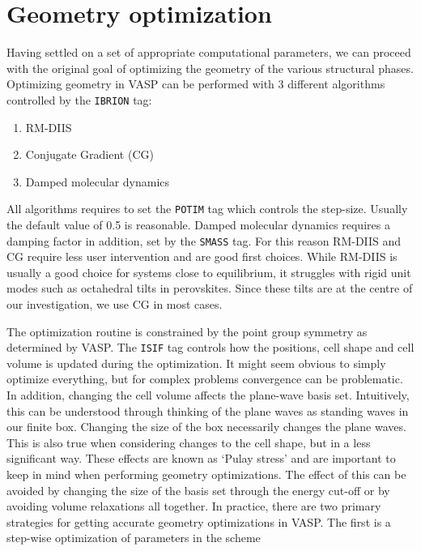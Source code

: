 \section{Geometry optimization}
Having settled on a set of appropriate computational parameters, we can proceed with the original goal of optimizing the geometry of the various structural phases. Optimizing geometry in VASP can be performed with 3 different algorithms controlled by the \texttt{IBRION} tag:

\begin{enumerate}
	\item RM-DIIS
	\item Conjugate Gradient (CG)
	\item Damped molecular dynamics
\end{enumerate}

\noindent All algorithms requires to set the \texttt{POTIM} tag which controls the step-size. Usually the default value of 0.5 is reasonable. Damped molecular dynamics requires a damping factor in addition, set by the \texttt{SMASS} tag. For this reason RM-DIIS and CG require less user intervention and are good first choices. While RM-DIIS is usually a good choice for systems close to equilibrium, it struggles with rigid unit modes such as octahedral tilts in perovskites. Since these tilts are at the centre of our investigation, we use CG in most cases.

The optimization routine is constrained by the point group symmetry as determined by VASP. The \texttt{ISIF} tag controls how the positions, cell shape and cell volume is updated during the optimization. It might seem obvious to simply optimize everything, but for complex problems convergence can be problematic. In addition, changing the cell volume affects the plane-wave basis set. Intuitively, this can be understood through thinking of the plane waves as standing waves in our finite box. Changing the size of the box necessarily changes the plane waves. This is also true when considering changes to the cell shape, but in a less significant way. These effects are known as `Pulay stress' \cite{zotero-1453} and are important to keep in mind when performing geometry optimizations. The effect of this can be avoided by changing the size of the basis set through the energy cut-off or by avoiding volume relaxations all together. In practice, there are two primary strategies for getting accurate geometry optimizations in VASP. The first is a step-wise optimization of parameters in the scheme


